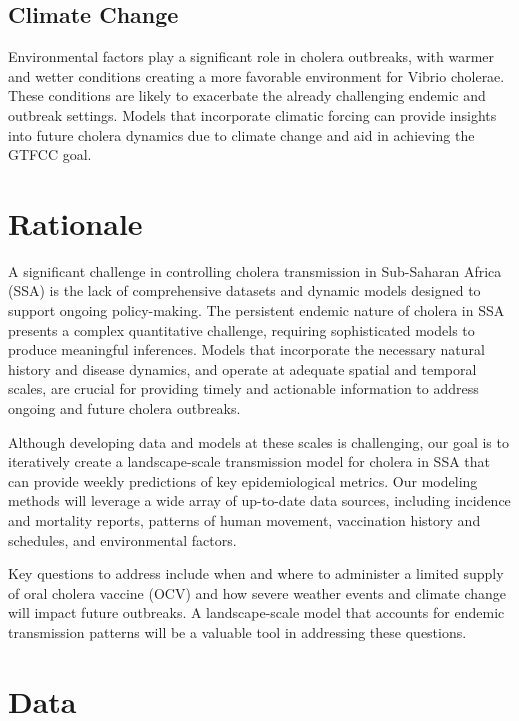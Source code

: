 \documentclass[
]{book}
\begin{document}
\section{Climate Change}\label{climate-change}

Environmental factors play a significant role in cholera outbreaks, with warmer and wetter conditions creating a more favorable environment for Vibrio cholerae. These conditions are likely to exacerbate the already challenging endemic and outbreak settings. Models that incorporate climatic forcing can provide insights into future cholera dynamics due to climate change and aid in achieving the GTFCC goal.

\chapter{Rationale}\label{rationale}

A significant challenge in controlling cholera transmission in Sub-Saharan Africa (SSA) is the lack of comprehensive datasets and dynamic models designed to support ongoing policy-making. The persistent endemic nature of cholera in SSA presents a complex quantitative challenge, requiring sophisticated models to produce meaningful inferences. Models that incorporate the necessary natural history and disease dynamics, and operate at adequate spatial and temporal scales, are crucial for providing timely and actionable information to address ongoing and future cholera outbreaks.

Although developing data and models at these scales is challenging, our goal is to iteratively create a landscape-scale transmission model for cholera in SSA that can provide weekly predictions of key epidemiological metrics. Our modeling methods will leverage a wide array of up-to-date data sources, including incidence and mortality reports, patterns of human movement, vaccination history and schedules, and environmental factors.

Key questions to address include when and where to administer a limited supply of oral cholera vaccine (OCV) and how severe weather events and climate change will impact future outbreaks. A landscape-scale model that accounts for endemic transmission patterns will be a valuable tool in addressing these questions.

\chapter{Data}\label{data}
\end{document}
